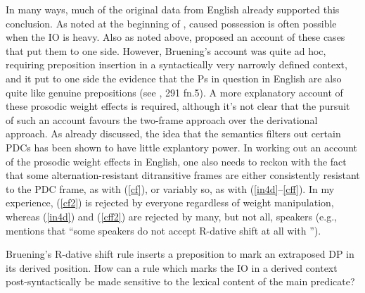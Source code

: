 \documentclass[output=paper,colorlinks,citecolor=brown]{langscibook}
\begin{document}
In many ways, much of the original data from English already supported this conclusion. As noted at the beginning of , caused possession is often possible when the IO is heavy. Also as noted above, \citet{gt:Bruening:2010b} proposed an account of these cases that put them to one side. However, Bruening's account was quite ad hoc, requiring preposition insertion in a syntactically very narrowly defined context, and it put to one side the evidence that the Ps in question in English are also quite like genuine prepositions (see \citealt{gt:Bruening:2010b}, 291 fn.5). A more explanatory account of these prosodic weight effects is required, although it's not clear that the pursuit of such an account favours the two-frame approach over the derivational approach. As already discussed, the idea that the  semantics filters out certain PDCs has been shown to have little explantory power. In working out an account of the prosodic weight effects in English, one also needs to reckon with the fact that some alternation-resistant ditransitive frames are either consistently resistant to the PDC frame, as with (\ref{cf}), or variably so, as with (\ref{in4d}--\ref{cff}). In my experience, (\ref{cf2}) is rejected by everyone regardless of weight manipulation, whereas (\ref{in4d}) and (\ref{cff2}) are rejected by many, but not all, speakers (e.g., \cite[295]{gt:Bruening:2010b} mentions that ``some speakers do not accept R-dative shift at all with ''). 




\noindent Bruening's R-dative shift rule inserts a preposition to mark an extraposed DP in its derived position. How can a rule which marks the IO in a derived context post-syntactically be made sensitive to the lexical content of the main predicate? 
\end{document}
